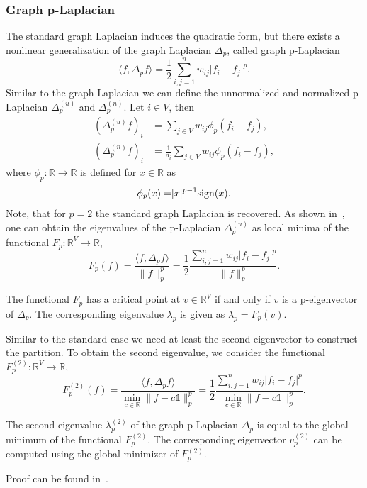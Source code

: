 \subsubsection*{Graph p-Laplacian}
The standard graph Laplacian induces the quadratic form, but there exists a nonlinear generalization of the graph Laplacian $\Delta_{p}$, called graph p-Laplacian~\cite{Amghibech03}
\begin{equation*}
\langle f,\Delta_{p} f\rangle = \frac{1}{2} \sum \limits_{i,j=1}^n w_{ij} \rvert f_i - f_j\rvert^p. 
\end{equation*}
Similar to the graph Laplacian we can define the unnormalized and normalized p-Laplacian $\Delta_{p}^{(u)}$ and $\Delta_{p}^{(n)}$. Let $i \in V$, then
\begin{equation*}
\begin{aligned}
(\Delta_{p}^{(u)}f)_i &= \sum \limits_{j\in V} w_{ij}\phi_p ( f_i - f_j ),\\
(\Delta_{p}^{(n)}f)_i &= \frac{1}{d_i}\sum \limits_{j\in V} w_{ij}\phi_p ( f_i - f_j ),
\end{aligned} 
\end{equation*}
where $\phi_p:\mathbb{R}\longrightarrow \mathbb{R}$ is defined for $x \in \mathbb{R}$ as
\begin{equation*}
 \phi_p(x) = \rvert x \lvert^{p-1} \operatorname{sign}(x).
\end{equation*}
Note, that for $p=2$ the standard graph Laplacian is recovered. As shown in~\cite{Buhler09}, one can obtain the eigenvalues of the %
p-Laplacian $\Delta_{p}^{(u)}$ as local minima of the functional
$F_p: \mathbb{R}^V\longrightarrow \mathbb{R}$,
\begin{equation*}
 F_p(f) = \frac{\langle f, \Delta_{p}f\rangle}{\lVert f\rVert_p^p} = \frac{1}{2} \frac{ \sum \limits_{i,j=1}^n w_{ij} \rvert f_i - f_j\rvert^p}{\lVert f\rVert_p^p}. 
\end{equation*}
\begin{theorem}
The functional $F_p$ has a critical point at $v \in \mathbb{R}^V$ if and only if $v$ is a p-eigenvector of $\Delta_{p}$. The corresponding eigenvalue $\lambda_p$ is given as $\lambda_p = F_p(v)$.
\end{theorem}
Similar to the standard case we need at least the second eigenvector to construct the partition. To obtain the second eigenvalue, we consider the functional $F_p^{(2)}: \mathbb{R}^V\longrightarrow \mathbb{R}$,
\begin{equation*}
 F_p^{(2)}(f) = \frac{\langle f, \Delta_{p}f\rangle}{\min\limits_{c \in \mathbb{R}}\lVert f-c\mathds{1}\rVert_p^p} = \frac{1}{2} \frac{ \sum \limits_{i,j=1}^n w_{ij} \rvert f_i - f_j\rvert^p}{\min\limits_{c \in \mathbb{R}}\lVert f-c\mathds{1}\rVert_p^p}. 
\end{equation*}
\begin{theorem}
The second eigenvalue $\lambda_p^{(2)}$ of the graph p-Laplacian $\Delta_{p}$ is equal to the global minimum of the functional $F_p^{(2)}$. The corresponding eigenvector $v_p^{(2)}$ can be computed using the global minimizer of $F_p^{(2)}$.
\end{theorem}
Proof can be found in~\cite{Buhler09}.
